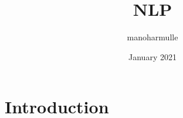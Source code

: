 \documentclass{article}
\title{NLP}
\author{manoharmulle }
\date{January 2021}
\begin{document}
\maketitle

\section{Introduction}
\end{document}
